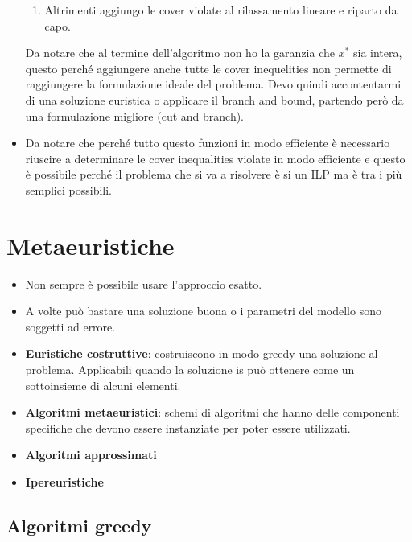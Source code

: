 \begin{itemize}
\begin{enumerate}
		\item Altrimenti aggiungo le cover violate al rilassamento lineare e riparto da capo.
	\end{enumerate}
	Da notare che al termine dell'algoritmo non ho la garanzia che $x^*$ sia intera, questo perché aggiungere anche tutte le cover inequelities non permette di raggiungere la formulazione ideale del problema. Devo quindi accontentarmi di una soluzione euristica o applicare il branch and bound, partendo però da una formulazione migliore (cut and branch).
	\item Da notare che perché tutto questo funzioni in modo efficiente è necessario riuscire a determinare le cover inequalities violate in modo efficiente e questo è possibile perché il problema che si va a risolvere è si un ILP ma è tra i più semplici possibili.
\end{itemize}

\section{Metaeuristiche}

\begin{itemize}
	\item Non sempre è possibile usare l'approccio esatto.
	\item A volte può bastare una soluzione buona o i parametri del modello sono soggetti ad errore.
	\item \textbf{Euristiche costruttive}: costruiscono in modo greedy una soluzione al problema. Applicabili quando la soluzione is può ottenere come un sottoinsieme di alcuni elementi.
	\item \textbf{Algoritmi metaeuristici}: schemi di algoritmi che hanno delle componenti specifiche che devono essere instanziate per poter essere utilizzati.
	\item \textbf{Algoritmi approssimati}
	\item \textbf{Ipereuristiche}
\end{itemize}

\subsection{Algoritmi greedy}


